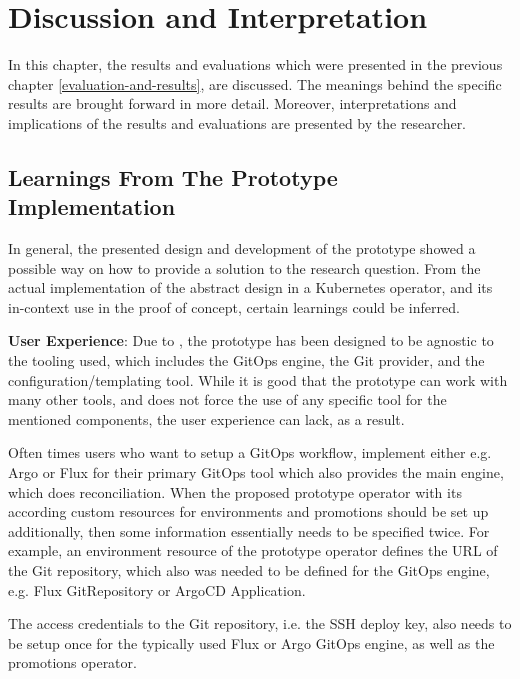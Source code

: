 \chapter{Discussion and Interpretation}
\label{discussion-and-interpretation}

In this chapter,
the results and evaluations which were presented in the previous chapter \ref{evaluation-and-results},
are discussed. The meanings behind the specific results are brought forward in more detail.
Moreover, interpretations and implications of the results and evaluations are presented by the researcher.


\section{Learnings From The Prototype Implementation}

In general, the presented design and development of the prototype
showed a possible way on how to provide a solution to the research question.
From the actual implementation of the abstract design in a Kubernetes operator,
and its in-context use in the proof of concept,
certain learnings could be inferred.

\textbf{User Experience}:
Due to ,
the prototype has been designed to be agnostic to the tooling used, which includes the GitOps engine, the Git provider, and the configuration/templating tool.
While it is good that the prototype can work with many other tools,
and does not force the use of any specific tool for the mentioned components,
the user experience can lack, as a result.

Often times users who want to setup a GitOps workflow,
implement either e.g. Argo or Flux for their primary GitOps tool which also provides the main engine,
which does reconciliation.
When the proposed prototype operator with its according custom resources for environments and promotions
should be set up additionally,
then some information essentially needs to be specified twice. For example,
an environment resource of the prototype operator defines the URL of the Git repository,
which also was needed to be defined for the GitOps engine, e.g. Flux GitRepository or ArgoCD Application.

The access credentials to the Git repository, i.e. the SSH deploy key,
also needs to be setup once for the typically used Flux or Argo GitOps engine,
as well as the promotions operator.

